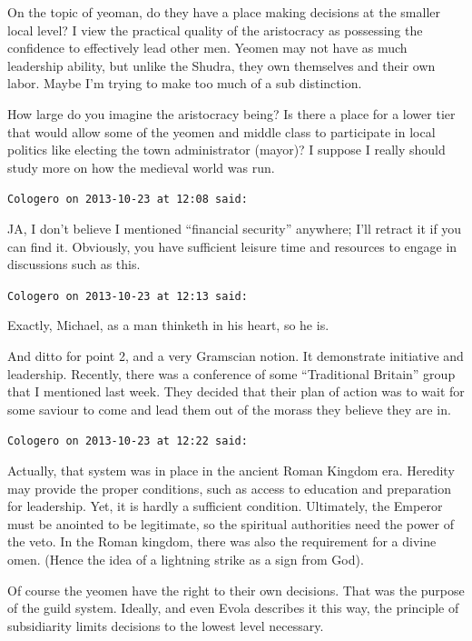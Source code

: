 \begin{footnotesize}
\begin{sffamily}
On the topic of yeoman, do they have a place making decisions at the smaller local level? I view the practical quality of the aristocracy as possessing the confidence to effectively lead other men. Yeomen may not have as much leadership ability, but unlike the Shudra, they own themselves and their own labor. Maybe I'm trying to make too much of a sub distinction.

How large do you imagine the aristocracy being? Is there a place for a lower tier that would allow some of the yeomen and middle class to participate in local politics like electing the town administrator (mayor)? I suppose I really should study more on how the medieval world was run.

\hfill

\texttt{Cologero on 2013-10-23 at 12:08 said:}

JA, I don't believe I mentioned ``financial security'' anywhere; I'll retract it if you can find it. Obviously, you have sufficient leisure time and resources to engage in discussions such as this.

\hfill

\texttt{Cologero on 2013-10-23 at 12:13 said:}

Exactly, Michael, as a man thinketh in his heart, so he is.

And ditto for point 2, and a very Gramscian notion. It demonstrate initiative and leadership. Recently, there was a conference of some ``Traditional Britain'' group that I mentioned last week. They decided that their plan of action was to wait for some saviour to come and lead them out of the morass they believe they are in.

\hfill

\texttt{Cologero on 2013-10-23 at 12:22 said:}

Actually, that system was in place in the ancient Roman Kingdom era. Heredity may provide the proper conditions, such as access to education and preparation for leadership. Yet, it is hardly a sufficient condition. Ultimately, the Emperor must be anointed to be legitimate, so the spiritual authorities need the power of the veto. In the Roman kingdom, there was also the requirement for a divine omen. (Hence the idea of a lightning strike as a sign from God).

Of course the yeomen have the right to their own decisions. That was the purpose of the guild system. Ideally, and even Evola describes it this way, the principle of subsidiarity limits decisions to the lowest level necessary.


\end{sffamily}
\end{footnotesize}
